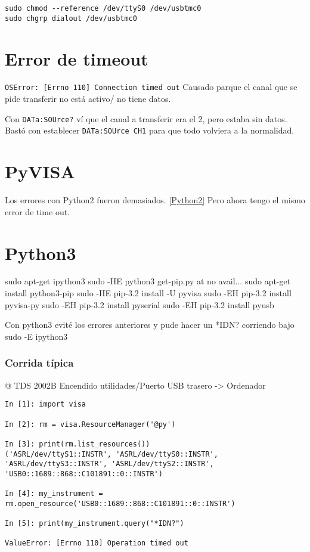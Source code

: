 \documentclass[a4paper]{article}
\begin{document}
\begin{verbatim}
sudo chmod --reference /dev/ttyS0 /dev/usbtmc0
sudo chgrp dialout /dev/usbtmc0
\end{verbatim}



\section{Error de timeout}
\verb'OSError: [Errno 110] Connection timed out'
Causado parque el canal que se pide transferir no está activo/ no tiene datos.

Con \verb'DATa:SOUrce?' ví que el canal a transferir era el 2, pero estaba sin datos.
Bastó con establecer \verb'DATa:SOUrce CH1' para que todo volviera a la normalidad. 


\section{PyVISA}

Los errores con Python2 fueron demasiados. \ref{Python2}
Pero ahora tengo el mismo error de time out. 


\section{Python3}
sudo apt-get ipython3
sudo -HE python3 get-pip.py at no avail... sudo apt-get install python3-pip
sudo -HE pip-3.2 install -U pyvisa
sudo -EH pip-3.2 install pyvisa-py
sudo -EH pip-3.2 install pyserial
sudo -EH pip-3.2 install pyusb

Con python3 evité los errores anteriores y pude hacer un *IDN? corriendo bajo sudo -E ipython3


\subsubsection{Corrida típica}
@ TDS 2002B
Encendido
utilidades/Puerto USB trasero -> Ordenador

\begin{verbatim}
In [1]: import visa

In [2]: rm = visa.ResourceManager('@py')

In [3]: print(rm.list_resources())
('ASRL/dev/ttyS1::INSTR', 'ASRL/dev/ttyS0::INSTR', 'ASRL/dev/ttyS3::INSTR', 'ASRL/dev/ttyS2::INSTR', 'USB0::1689::868::C101891::0::INSTR')

In [4]: my_instrument = rm.open_resource('USB0::1689::868::C101891::0::INSTR')

In [5]: print(my_instrument.query("*IDN?") 

ValueError: [Errno 110] Operation timed out
\end{verbatim}
\end{document}
